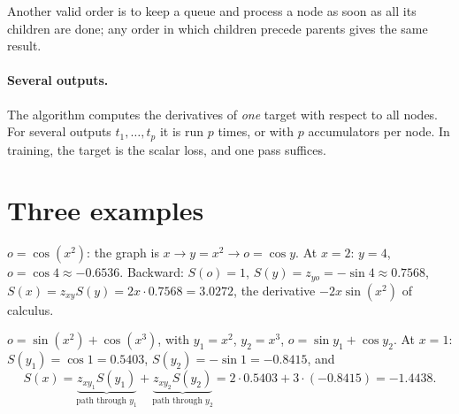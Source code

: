 \begin{notechapter}
Another valid order is to keep a queue and process a node as soon as all its children are
done; any order in which children precede parents gives the same result.

\paragraph{Several outputs.} The algorithm computes the derivatives of \emph{one} target with
respect to all nodes. For several outputs $t_1,\dots,t_p$ it is run $p$ times, or with $p$ accumulators per
node. In training, the target is the scalar loss, and one pass suffices.

\section{Three examples}\label{computational-graphs:sec:examples}

\begin{example}\label{computational-graphs:ex:path}
$o = \cos(x^2)$: the graph is $x\to y = x^2\to o = \cos y$. At $x = 2$: $y = 4$, $o = \cos4\approx-0.6536$. Backward:
$S(o) = 1$, $S(y) = z_{yo} = -\sin4\approx0.7568$, $S(x) = z_{xy}S(y) = 2x\cdot0.7568 = 3.0272$, the derivative $-2x\sin(x^2)$ of
calculus.
\end{example}

\begin{example}\label{computational-graphs:ex:diamond}
$o = \sin(x^2) + \cos(x^3)$, with $y_1 = x^2$, $y_2 = x^3$, $o = \sin y_1 + \cos y_2$. At $x = 1$: $S(y_1) = \cos1 = 0.5403$,
$S(y_2) = -\sin1 = -0.8415$, and
\[
  S(x) = \underbrace{z_{xy_1}S(y_1)}_{\text{path through }y_1} + \underbrace{z_{xy_2}S(y_2)}_{\text{path through }y_2}
  = 2\cdot0.5403 + 3\cdot(-0.8415) = -1.4438 .
\]
\end{example}


\end{notechapter}
